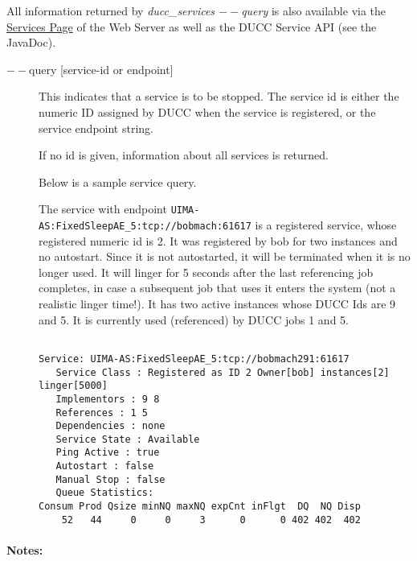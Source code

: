     All information returned by {\em ducc\_services $--$query} is also available via the
    \hyperref[ws:services-page]{Services Page} of the Web Server as well as the DUCC Service API (see 
    the JavaDoc).

    \begin{description}
    \item[$--$query {[service-id or endpoint]}] This indicates that a service is to be stopped. The
      service id is either the numeric ID assigned by DUCC when the service is registered, or the
      service endpoint string.

      If no id is given, information about all services is returned. 

      Below is a sample service query.

      The service with endpoint {\tt UIMA-AS:FixedSleepAE\_5:tcp://bobmach:61617} is a 
      registered service, whose registered numeric id is 2. It was registered by bob for two instances and 
      no autostart. Since it is not autostarted, it will be terminated when it is no longer used. It 
      will linger for 5 seconds after the last referencing job completes, in case a subsequent job 
      that uses it enters the system (not a realistic linger time!). It has two active
      instances whose DUCC Ids are 9 and 5. It is currently used (referenced) 
      by DUCC jobs 1 and 5. 


\begin{verbatim}

Service: UIMA-AS:FixedSleepAE_5:tcp://bobmach291:61617 
   Service Class : Registered as ID 2 Owner[bob] instances[2] linger[5000] 
   Implementors : 9 8 
   References : 1 5 
   Dependencies : none 
   Service State : Available 
   Ping Active : true 
   Autostart : false 
   Manual Stop : false 
   Queue Statistics: 
Consum Prod Qsize minNQ maxNQ expCnt inFlgt  DQ  NQ Disp 
    52   44     0     0     3      0      0 402 402  402 
\end{verbatim}
    \end{description}
    \paragraph{Notes:}

